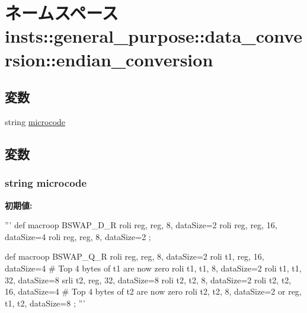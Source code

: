 \hypertarget{namespaceinsts_1_1general__purpose_1_1data__conversion_1_1endian__conversion}{
\section{ネームスペース insts::general\_\-purpose::data\_\-conversion::endian\_\-conversion}
\label{namespaceinsts_1_1general__purpose_1_1data__conversion_1_1endian__conversion}
}
\subsection*{変数}
\begin{DoxyCompactItemize}
\item 
string \hyperlink{namespaceinsts_1_1general__purpose_1_1data__conversion_1_1endian__conversion_a770f11a173e99389a8802f0107ed8f52}{microcode}
\end{DoxyCompactItemize}


\subsection{変数}
\hypertarget{namespaceinsts_1_1general__purpose_1_1data__conversion_1_1endian__conversion_a770f11a173e99389a8802f0107ed8f52}{
\subsubsection[{microcode}]{\setlength{\rightskip}{0pt plus 5cm}string {\bf microcode}}}
\label{namespaceinsts_1_1general__purpose_1_1data__conversion_1_1endian__conversion_a770f11a173e99389a8802f0107ed8f52}
{\bfseries 初期値:}
\begin{DoxyCode}
'''
def macroop BSWAP_D_R
{
    roli reg, reg, 8, dataSize=2
    roli reg, reg, 16, dataSize=4
    roli reg, reg, 8, dataSize=2
};

def macroop BSWAP_Q_R
{
    roli reg, reg, 8, dataSize=2
    roli t1, reg, 16, dataSize=4
    # Top 4 bytes of t1 are now zero
    roli t1, t1, 8, dataSize=2
    roli t1, t1, 32, dataSize=8
    srli t2, reg, 32, dataSize=8
    roli t2, t2, 8, dataSize=2
    roli t2, t2, 16, dataSize=4
    # Top 4 bytes of t2 are now zero
    roli t2, t2, 8, dataSize=2
    or reg, t1, t2, dataSize=8
};
'''
\end{DoxyCode}
